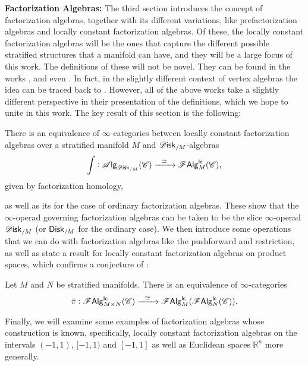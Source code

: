 \documentclass[../text.tex]{subfiles}
\begin{document}
\textbf{ Factorization Algebras:} The third section introduces the concept of factorization algebras, together with its different variations, like prefactorization algebras and locally constant factorization algebras. Of these, the locally constant factorization algebras will be the ones that capture the different possible stratified structures that a manifold can have, and they will be a large focus of this work. The definitions of these will not be novel. They can be found in the works \cite{cg2016}, \cite{ginot2015} and even \cite{af_primer}. In fact, in the slightly different context of vertex algebras the idea can be traced back to \cite{bd2004}. However, all of the above works take a slightly different perspective in their presentation of the definitions, which we hope to unite in this work. The key result of this section is the following:
%
\begin{theorem*}[\ref{thm:disk_alg=lcfa}]
    There is an equivalence of $\infty$-categories between locally constant factorization algebras over a stratified manifold $M$ and $\disk_{/M}$-algebras
    \begin{equation}
        \int: \alg{\disk_{/M}} (\catC) \xrightarrow{\ \ \simeq \ \ } \lcfa_M (\catC),
    \end{equation}
    given by factorization homology,
\end{theorem*}
%
as well as its  for the case of ordinary factorization algebras. These show that the $\infty$-operad governing factorization algebras can be taken to be the slice $\infty$-operad $\disk_{/M}$ (or $\disk[r]_{/M}$ for the ordinary case). We then introduce some operations that we can do with factorization algebras like the pushforward and restriction, as well as state a result for locally constant factorization algebras on product spaces, which confirms a conjecture of \cite{ginot2015}:
%
\begin{proposition*}[\ref{prop:exp_of_products_lc}]
    Let $M$ and $N$ be stratified manifolds. There is an equivalence of $\infty$-categories
    \begin{equation}
        \bar{\pi}: \mathscr{F} \mathsf{Alg}^{\mathsf{lc}}_{M \times N}(\mathscr{C}) \xrightarrow{\ \ \simeq \ \ } \mathscr{F} \mathsf{Alg}^{\mathsf{lc}}_{M}(\mathscr{F} \mathsf{Alg}^{\mathsf{lc}}_{N}(\mathscr{C})).
    \end{equation}
\end{proposition*}
%
Finally, we will examine some examples of factorization algebras whose construction is known, specifically, locally constant factorization algebras on the intervals $(-1,1)$, $[-1,1)$ and $[-1,1]$ as well as Euclidean spaces $\mathbb{R}^n$ more generally.
\end{document}
